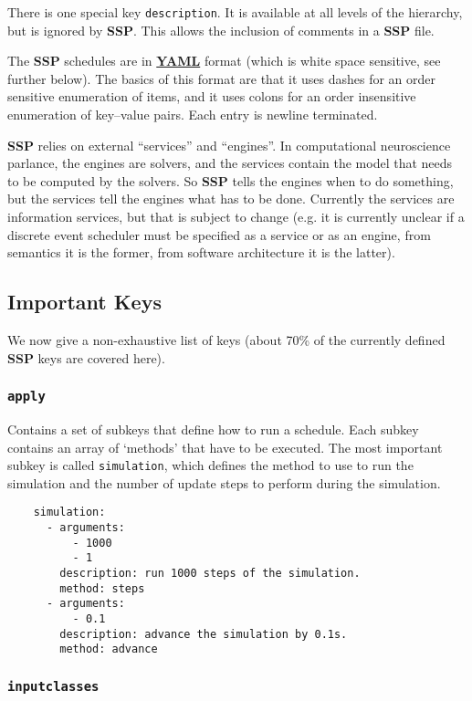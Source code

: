 \documentclass[12pt]{article}
\begin{document}
There is one special key {\tt description}. It is available at all levels of the hierarchy, but is ignored by {\bf SSP}. This allows the inclusion of comments in a {\bf SSP} file.

The {\bf SSP} schedules are in \href{http://fdik.org/yml/}{\bf YAML} format (which is white space sensitive, see further below). The basics of this format are that it uses dashes for an order sensitive enumeration of items, and it uses colons for an order insensitive enumeration of key--value pairs. Each entry is newline terminated.

{\bf SSP} relies on external ``services'' and ``engines''. In computational neuroscience parlance, the engines are solvers, and the services contain the model that needs to be computed by the solvers. So {\bf SSP} tells the engines when to do something, but the services tell the engines what has to be done. Currently the services are information services, but that is subject to change (e.g. it is currently unclear if a discrete event scheduler must be specified as a service or as an engine, from semantics it is the former, from software architecture it is the latter).

\subsection*{Important Keys}

We now give a non-exhaustive list of keys (about 70\% of the currently defined {\bf SSP} keys are covered here).

\subsubsection*{\tt apply}

Contains a set of subkeys that define how to run a schedule. Each subkey contains an array of `methods' that have to be executed. The most important subkey is called {\tt simulation}, which defines the method to use to run the simulation and the number of update steps to perform during the simulation. 
\begin{verbatim}
    simulation:
      - arguments:
          - 1000
          - 1
        description: run 1000 steps of the simulation.
        method: steps
      - arguments:
          - 0.1
        description: advance the simulation by 0.1s.
        method: advance
\end{verbatim}

\subsubsection*{\tt inputclasses}
\end{document}
